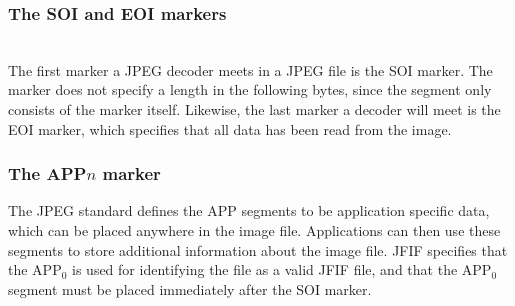 \begin{infobox}
\subsubsection*{The SOI and EOI markers}
\begin{centering}
\hspace{1.2cm} 
\end{centering}\\
The first marker a JPEG decoder meets in a JPEG file is the SOI marker. 
The marker does not specify a length in the following bytes, since the segment only consists of the marker itself.
Likewise, the last marker a decoder will meet is the EOI marker, which specifies that all data has been read from the image.

\subsubsection*{The APP$n$ marker}
\begin{centering}
\end{centering}
The JPEG standard defines the APP segments to be application specific data, which can be placed anywhere in the image file. Applications can then use these segments to store additional information about the image file. JFIF specifies that the APP$_0$ is used for identifying the file as a valid JFIF file, and that the APP$_0$ segment must be placed immediately after the SOI marker.


\end{infobox}
